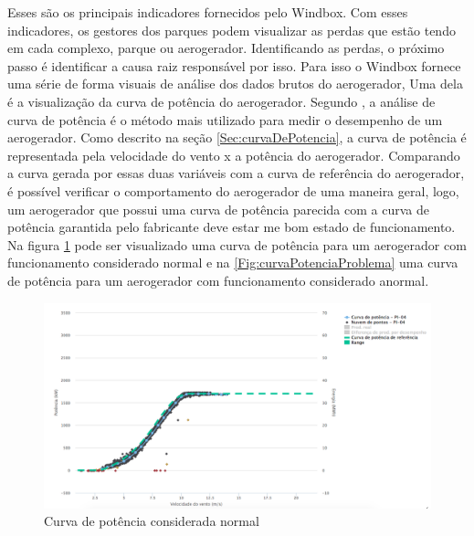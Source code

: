 Esses são os principais indicadores fornecidos pelo Windbox. Com esses indicadores, os gestores dos parques podem visualizar as perdas que estão tendo em cada complexo, parque ou aerogerador. Identificando as perdas, o próximo passo é identificar a causa raiz responsável por isso. Para isso o Windbox fornece uma série de forma visuais de análise dos dados brutos do aerogerador, Uma dela é a visualização da curva de potência do aerogerador. Segundo , a análise de curva de potência é o método mais utilizado para medir o desempenho de um aerogerador. Como descrito na seção \ref{Sec:curvaDePotencia}, a curva de potência é representada pela velocidade do vento x a potência do aerogerador. Comparando a curva gerada por essas duas variáveis com a curva de referência do aerogerador, é possível verificar o comportamento do aerogerador de uma maneira geral, logo, um aerogerador que possui uma curva de potência parecida com a curva de potência garantida pelo fabricante deve estar me bom estado de funcionamento. Na figura \ref{Fig:curvaPotenciaNormal} pode ser visualizado uma curva de potência para um aerogerador com funcionamento considerado normal e na \ref{Fig:curvaPotenciaProblema} uma curva de potência para um aerogerador com funcionamento considerado anormal.

\begin{figure}[htbp!] \begin{center}
\includegraphics[width=1\linewidth]{./figuras/curva-potencia-normal}
\caption{Curva de potência considerada normal}
\label{Fig:curvaPotenciaNormal}
\end{center} 
\end{figure}


